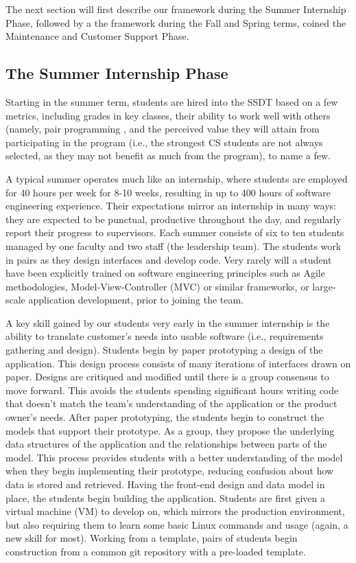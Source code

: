 The next section will first describe our framework during the Summer Internship Phase, followed by a the framework during the Fall and Spring terms, coined the Maintenance and Customer Support Phase.

\subsection{The Summer Internship Phase}
Starting in the summer term, students are hired into the SSDT based on a few metrics, including grades in key classes, their ability to work well with others (namely, pair programming \cite{2002PairProgramming}, and the perceived value they will attain from participating in the program (i.e., the strongest CS students are not always selected, as they may not benefit as much from the program), to name a few.

A typical summer operates much like an internship, where students are employed for 40 hours per week for 8-10 weeks, resulting in up to 400 hours of software engineering experience. Their expectations mirror an internship in many ways: they are expected to be punctual, productive throughout the day, and regularly report their progress to supervisors. Each summer consists of six to ten students managed by one faculty and two staff (the leadership team). The students work in pairs as they design interfaces and develop code. Very rarely will a student have been explicitly trained on software engineering principles such as Agile methodologies, Model-View-Controller (MVC) or similar frameworks, or large-scale application development, prior to joining the team.

A key skill gained by our students very early in the summer internship is the ability to translate customer's needs into usable software (i.e., requirements gathering and design). Students begin by paper prototyping \cite{2003paperPrototype} a design of the application. This design process consists of many iterations of interfaces drawn on paper. Designs are critiqued and modified until there is a group consensus to move forward. This avoids the students spending significant hours writing code that doesn’t match the team’s understanding of the application or the product owner’s needs. After paper prototyping, the students begin to construct the models that support their prototype. As a group, they propose the underlying data structures of the application and the relationships between parts of the model. This process provides students with a better understanding of the model when they begin implementing their prototype, reducing confusion about how data is stored and retrieved. Having the front-end design and data model in place, the students begin building the application. Students are first given a virtual machine (VM) to develop on, which mirrors the production environment, but also requiring them to learn some basic Linux commands and usage (again, a new skill for most). Working from a template, pairs of students begin construction from a common git repository with a pre-loaded template.

